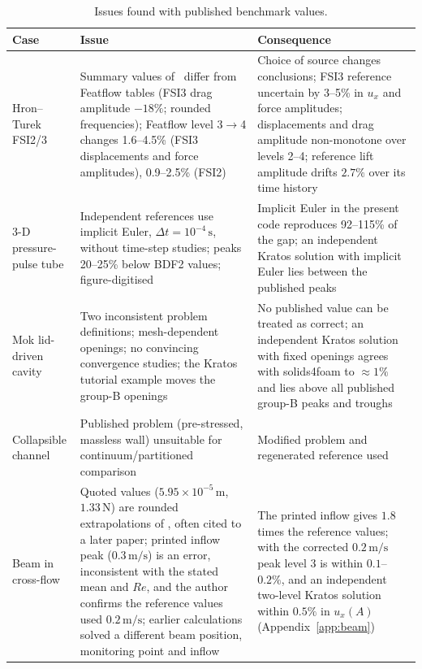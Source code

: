\begin{table}[htbp]
	\centering
	\footnotesize
	\setlength{\tabcolsep}{3pt}
	\caption{Issues found with published benchmark values.}
	\label{tab:published}
	\begin{tabular}{p{2.8cm}p{5.8cm}p{5.0cm}}
		\toprule
		Case & Issue & Consequence \\
		\midrule
		Hron--Turek FSI2/3 & Summary values of~\citet{Turek2006} differ from Featflow tables (FSI3 drag amplitude $-18\%$; rounded frequencies); Featflow level 3$\to$4 changes 1.6--4.5\% (FSI3 displacements and force amplitudes), 0.9--2.5\% (FSI2) & Choice of source changes conclusions; FSI3 reference uncertain by 3--5\% in $u_x$ and force amplitudes; displacements and drag amplitude non-monotone over levels 2--4; reference lift amplitude drifts $2.7\%$ over its time history \\
		3-D pressure-pulse tube & Independent references use implicit Euler, $\Delta t = 10^{-4}\,\mathrm{s}$, without time-step studies; peaks 20--25\% below BDF2 values; figure-digitised & Implicit Euler in the present code reproduces 92--115\% of the gap; an independent Kratos solution with implicit Euler lies between the published peaks \\
		Mok lid-driven cavity & Two inconsistent problem definitions; mesh-dependent openings; no convincing convergence studies; the Kratos tutorial example moves the group-B openings & No published value can be treated as correct; an independent Kratos solution with fixed openings agrees with solids4foam to $\approx1\%$ and lies above all published group-B peaks and troughs \\
		Collapsible channel & Published problem (pre-stressed, massless wall) unsuitable for continuum/partitioned comparison & Modified problem and regenerated reference used \\
		Beam in cross-flow & Quoted values ($5.95\times10^{-5}\,\mathrm{m}$, $1.33\,\mathrm{N}$) are rounded extrapolations of \citet{Richter2012}, often cited to a later paper; printed inflow peak ($0.3\,\mathrm{m/s}$) is an error, inconsistent with the stated mean and $Re$, and the author confirms the reference values used $0.2\,\mathrm{m/s}$; earlier calculations solved a different beam position, monitoring point and inflow & The printed inflow gives $1.8$ times the reference values; with the corrected $0.2\,\mathrm{m/s}$ peak level 3 is within $0.1$--$0.2\%$, and an independent two-level Kratos solution within $0.5\%$ in $u_x(A)$ (Appendix~\ref{app:beam}) \\

\end{tabular}
\end{table}
